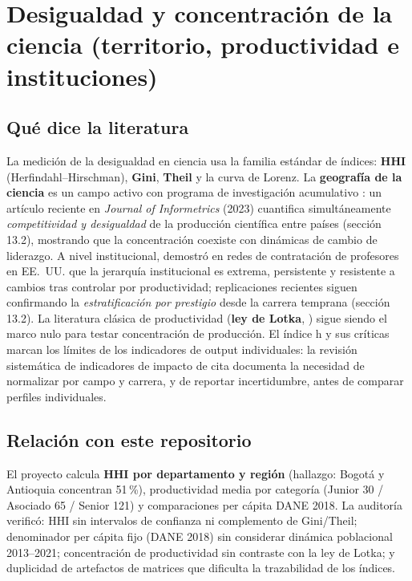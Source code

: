 \section{Desigualdad y concentración de la ciencia (territorio, productividad e instituciones)}

\subsection{Qué dice la literatura}

La medición de la desigualdad en ciencia usa la familia estándar de índices:
\textbf{HHI} (Herfindahl--Hirschman), \textbf{Gini}, \textbf{Theil}
\citep{theil1967economics} y la curva de Lorenz. La \textbf{geografía de la
ciencia} es un campo activo con programa de investigación acumulativo
\citep{frenken2009spatial}: un artículo reciente en \emph{Journal of
Informetrics} (2023) cuantifica simultáneamente \emph{competitividad y
desigualdad} de la producción científica entre países (sección 13.2),
mostrando que la concentración coexiste con dinámicas de cambio de liderazgo.
A nivel institucional, \citet{clauset2015systematic} demostró en redes de
contratación de profesores en EE.~UU. que la jerarquía institucional es
extrema, persistente y resistente a cambios tras controlar por productividad;
replicaciones recientes siguen confirmando la \emph{estratificación por
prestigio} desde la carrera temprana (sección 13.2). La literatura clásica de
productividad (\textbf{ley de Lotka}, \citet{lotka1926frequency}) sigue siendo
el marco nulo para testar concentración de producción. El índice h
\citep{hirsch2005index} y sus críticas marcan los límites de los indicadores de
output individuales: la revisión sistemática de indicadores de impacto de cita
\citep{waltman2016review} documenta la necesidad de normalizar por campo y
carrera, y de reportar incertidumbre, antes de comparar perfiles individuales.

\subsection{Relación con este repositorio}

El proyecto calcula \textbf{HHI por departamento y región} (hallazgo: Bogotá y
Antioquia concentran 51\,\%), productividad media por categoría (Junior 30 /
Asociado 65 / Senior 121) y comparaciones per cápita DANE 2018. La auditoría
verificó: HHI sin intervalos de confianza ni complemento de Gini/Theil;
denominador per cápita fijo (DANE 2018) sin considerar dinámica poblacional
2013--2021; concentración de productividad sin contraste con la ley de Lotka;
y duplicidad de artefactos de matrices que dificulta la trazabilidad de los
índices.

